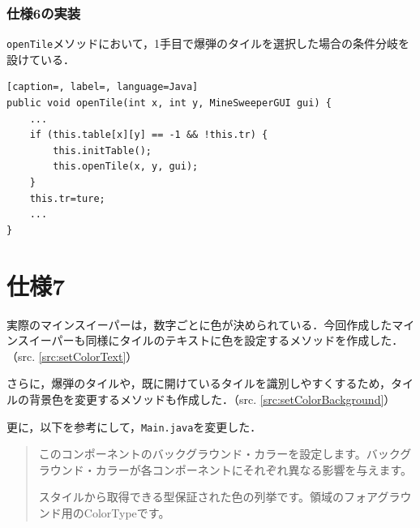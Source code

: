 \documentclass[a4j,11pt]{jsarticle}
\newcommand{\srcref}[1]{src. \ref{#1}}
\begin{document}
\subsubsection*{仕様6の実装}
\verb|openTile|メソッドにおいて，1手目で爆弾のタイルを選択した場合の条件分岐を設けている．
\begin{lstlisting}[caption=, label=, language=Java]
public void openTile(int x, int y, MineSweeperGUI gui) {
    ...
    if (this.table[x][y] == -1 && !this.tr) {
        this.initTable();
        this.openTile(x, y, gui);
    }
    this.tr=ture;
    ...
}
\end{lstlisting}
\section*{仕様7}
\setcounter{section}{7}
\setcounter{subsection}{0}
実際のマインスイーパーは，数字ごとに色が決められている．今回作成したマインスイーパーも同様にタイルのテキストに色を設定するメソッドを作成した．（\srcref{src:setColorText}）\par
さらに，爆弾のタイルや，既に開けているタイルを識別しやすくするため，タイルの背景色を変更するメソッドも作成した．（\srcref{src:setColorBackground}）\par

更に，以下を参考にして，\verb|Main.java|を変更した．
\begin{quotation}
    このコンポーネントのバックグラウンド・カラーを設定します。バックグラウンド・カラーが各コンポーネントにそれぞれ異なる影響を与えます。\hfill{\cite{label3}}\par
    スタイルから取得できる型保証された色の列挙です。領域のフォアグラウンド用のColorTypeです。\hfill{\cite{label4}}
\end{quotation}
\end{document}
